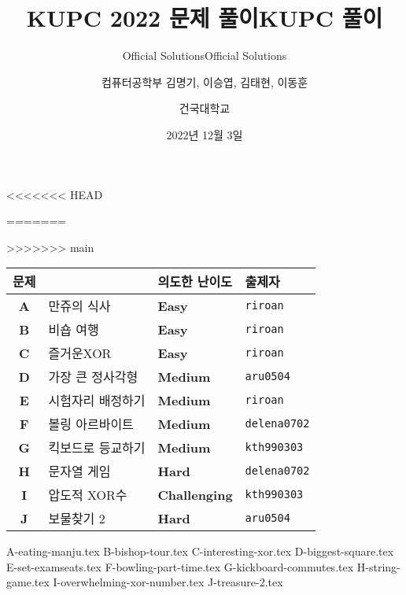 
\usetikzlibrary{arrows.meta,matrix,decorations.pathreplacing}

<<<<<<< HEAD
\title{KUPC 2022 문제 풀이}
\subtitle{Official Solutions}
\author{컴퓨터공학부 김명기, 이승엽, 김태현, 이동훈}
=======
\title{KUPC 풀이}
\subtitle{Official Solutions}
\author{건국대학교}
>>>>>>> main
\date{2022년 12월 3일}


    \setcounter{framenumber}{-1}
    \frame{\titlepage}
        
    \begin{frame} %
        \begin{center}
            \begin{tabular}{cl|l|l}
                \hline
                문제 & & 의도한 난이도 & 출제자 \\
                \hline
                \hline

                \textbf{A} & 만쥬의 식사& \textbf{\color{acbronze}Easy} & \texttt{riroan} \\
                \textbf{B} & 비숍 여행 & \textbf{\color{acbronze}Easy} & \texttt{riroan} \\
                \textbf{C} & 즐거운XOR & \textbf{\color{acsilver}Easy} & \texttt{riroan} \\
                \textbf{D} & 가장 큰 정사각형 & \textbf{\color{acsilver}Medium} & \texttt{aru0504} \\
                \textbf{E} & 시험자리 배정하기 & \textbf{\color{acsilver}Medium} & \texttt{riroan} \\
                \textbf{F} & 볼링 아르바이트 & \textbf{\color{acgold}Medium} & \texttt{delena0702} \\
                \textbf{G} & 킥보드로 등교하기 & \textbf{\color{acsilver}Medium} & \texttt{kth990303} \\
                \textbf{H} & 문자열 게임 & \textbf{\color{acgold}Hard} & \texttt{delena0702} \\
                \textbf{I} & 압도적 XOR수 & \textbf{\color{acgold}Challenging} & \texttt{kth990303} \\
                \textbf{J} & 보물찾기 2 & \textbf{\color{acgold}Hard} & \texttt{aru0504} \\

                \hline
            \end{tabular}
        \end{center}
    \end{frame}

    {A-eating-manju.tex}
    {B-bishop-tour.tex}
    {C-interesting-xor.tex}
    {D-biggest-square.tex}
    {E-set-examseats.tex}
    {F-bowling-part-time.tex}
    {G-kickboard-commutes.tex}
    {H-string-game.tex}
    {I-overwhelming-xor-number.tex}
    {J-treasure-2.tex}

